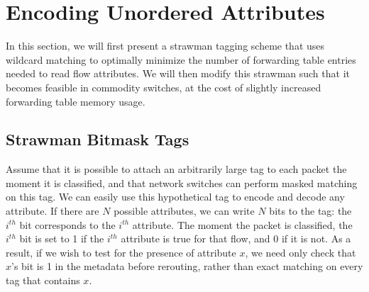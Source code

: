 \section{Encoding Unordered Attributes} 
\label{sec:flextag_encoding} 
In this section, we will first present a strawman tagging scheme that uses
wildcard matching to optimally minimize the number of forwarding table
entries needed to read flow attributes. We will then modify this strawman
such that it becomes feasible in commodity switches, at the cost
of slightly increased forwarding table memory usage.



\subsection{Strawman Bitmask Tags}
\label{ssec:bitmasks}
Assume that it is possible to attach an arbitrarily
large tag to each packet the moment it is classified, and that network switches
can perform masked matching on this tag.
We can easily use this hypothetical tag to encode and decode 
any attribute. If there are $N$ possible attributes, we can write $N$ bits to
the tag: the $i^{th}$ bit corresponds to the $i^{th}$ attribute. The moment
the packet is classified, the $i^{th}$ bit is set to 1 if the $i^{th}$ attribute
is true for that flow, and 0 if it is not. As a result, if we wish to test for
the presence of attribute $x$, we need only check that $x$'s bit is 1 in the
metadata before rerouting, rather than exact matching on every tag that contains
$x$.

